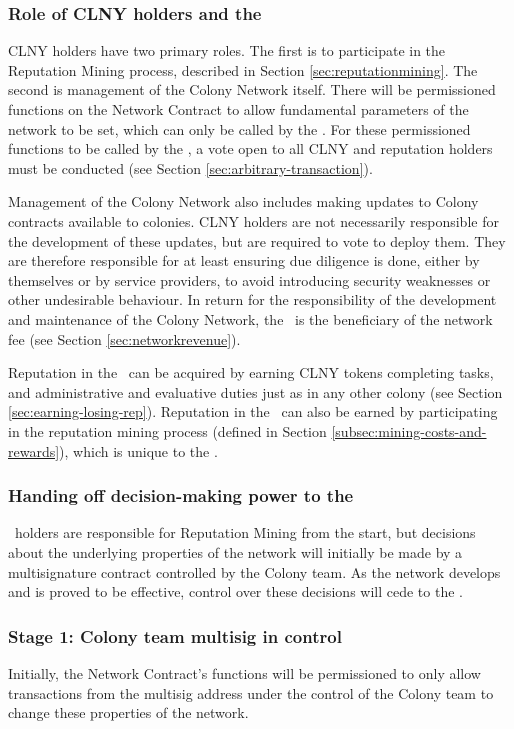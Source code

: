 \subsubsection{Role of CLNY holders and the \rc}

CLNY holders have two primary roles. The first is to participate in the Reputation Mining process, described in Section \ref{sec:reputationmining}. The second is management of the Colony Network itself. There will be permissioned functions on the Network Contract to allow fundamental parameters of the network to be set, which can only be called by the \rc. For these permissioned functions to be called by the \rc, a vote open to all CLNY and reputation holders must be conducted  (see Section \ref{sec:arbitrary-transaction}).

Management of the Colony Network also includes making updates to Colony contracts available to colonies. CLNY holders are not necessarily responsible for the development of these updates, but are required to vote to deploy them. They are therefore responsible for at least ensuring due diligence is done, either by themselves or by service providers, to avoid introducing security weaknesses or other undesirable behaviour. In return for the responsibility of the development and maintenance of the Colony Network, the \rc\ is the beneficiary of the network fee (see Section \ref{sec:networkrevenue}).

Reputation in the \rc\ can be acquired by earning CLNY tokens completing tasks, and administrative and evaluative duties just as in any other colony (see Section \ref{sec:earning-losing-rep}). Reputation in the \rc\ can also be earned by participating in the reputation mining process (defined in Section \ref{subsec:mining-costs-and-rewards}), which is unique to the \rc.

\subsubsection{Handing off decision-making power to the \rc}\label{subsec:ceding-control-to-rc}

\rct\ holders are responsible for Reputation Mining from the start, but decisions about the underlying properties of the network will initially be made by a multisignature contract controlled by the Colony team. As the network develops and is proved to be effective, control over these decisions will cede to the \rc.

\subsubsection*{Stage 1: Colony team multisig in control}
 Initially, the Network Contract's functions will be permissioned to only allow transactions from the multisig address under the control of the Colony team to change these properties of the network.


